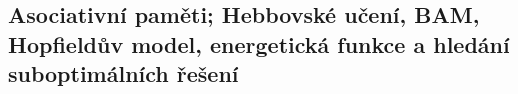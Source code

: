 \subsection{Asociativní paměti; Hebbovské učení, BAM, Hopfieldův model, energetická funkce a hledání suboptimálních řešení}